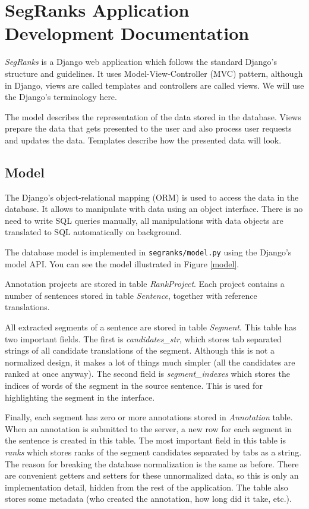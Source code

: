 \chapter{SegRanks Application Development Documentation}
\label{chapter:implementation}

\textit{SegRanks} is a Django web application which follows the standard
Django's structure and guidelines. It uses Model-View-Controller (MVC) pattern,
although in Django, views are called templates and controllers are called
views. We will use the Django's terminology here.

The model describes the representation of the data stored in the database.
Views prepare the data that gets presented to the user and also process user
requests and updates the data. Templates describe how the presented data will
look.

\section{Model}

The Django's object-relational mapping (ORM) is used to access the data in the
database. It allows to manipulate with data using an object interface. There
is no need to write SQL queries manually, all manipulations with data objects are
translated to SQL automatically on background. 

The database model is implemented in \texttt{segranks/model.py} using the
Django's model API. You can see the model illustrated in Figure \ref{model}.

Annotation projects are stored in table \textit{RankProject}. Each project
contains a number of sentences stored in table \textit{Sentence}, together with
reference translations. 

All extracted segments of a sentence are stored in table \textit{Segment}.
This table has two important fields. The first is \textit{candidates\_str},
which stores tab separated strings of all candidate translations of the
segment.  Although this is not a normalized design, it makes a lot of things
much simpler (all the candidates are ranked at once anyway).  The second field
is \textit{segment\_indexes} which stores the indices of words of the segment
in the source sentence.  This is used for highlighting the segment in the
interface.

Finally, each segment has zero or more annotations stored in
\textit{Annotation} table. When an annotation is submitted to the server, a new
row for each segment in the sentence is created in this table. The most
important field in this table is \textit{ranks} which stores ranks of the
segment candidates separated by tabs as a string. The reason for breaking the
database normalization is the same as before. There are convenient getters and
setters for these unnormalized data, so this is only an implementation detail,
hidden from the rest of the application. The table also stores some metadata
(who created the annotation, how long did it take, etc.).

